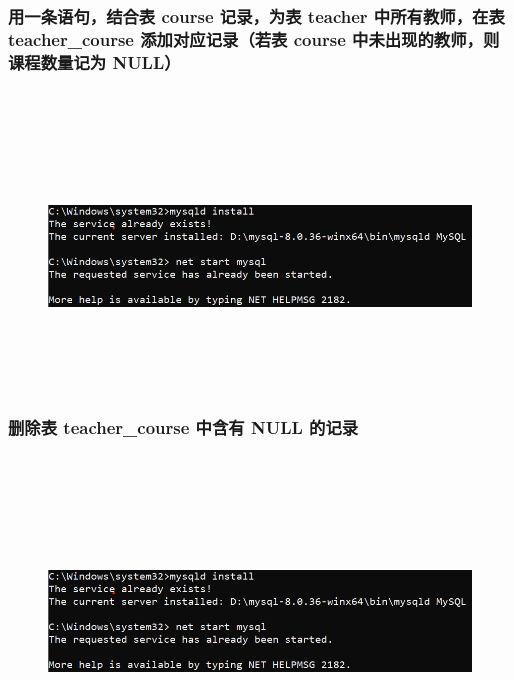 \documentclass{ctexart}
\begin{document}
\subsubsection{用一条语句，结合表 course 记录，为表 teacher 中所有教师，在表 teacher\_course 添加对应记录（若表 course 中未出现的教师，则课程数量记为 NULL）}
\begin{lstlisting}[language=sql]
	
\end{lstlisting}
\begin{figure}[H]
	\centering 
	\includegraphics[height=7cm,width=14cm]{1.png}
	\end{figure}
\subsubsection{删除表 teacher\_course 中含有 NULL 的记录}\begin{lstlisting}[language=sql]
	
\end{lstlisting}
\begin{figure}[H]
	\centering 
	\includegraphics[height=7cm,width=14cm]{1.png}
	\end{figure}
\end{document}
